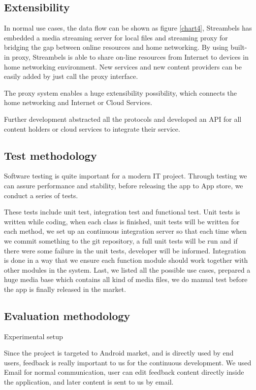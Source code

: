 \subsection{Extensibility}
In normal use cases, the data flow can be shown as figure \ref{chart4},
Streambels has embedded a media streaming server for local files and streaming
proxy for bridging the gap between online resources and home networking. By
using built-in proxy, Streambels is able to share on-line resources from
Internet to devices in home networking environment. New services and new
content providers can be easily added by just call the proxy interface.

The proxy system enables a huge extensibility possibility, which connects the
home networking and Internet or Cloud Services.

Further development abstracted all the protocols and developed an API for all
content holders or cloud services to integrate their service.

\subsection{Test methodology}
Software testing is quite important for a modern IT project. Through testing we
can assure performance and stability, before releasing the app to App store, we
conduct a series of tests.

These tests include unit test, integration test and functional test.
Unit tests is written while coding, when each class is finished, unit tests will
be written for each method, we set up an continuous integration server so that
each time when we commit something to the git repository, a full unit tests will
be run and if there were some failure in the unit tests, developer will be
informed. Integration is done in a way that we ensure each function module
should work together with other modules in the system. Last, we listed all the
possible use cases, prepared a huge media base which contains all kind of media
files, we do manual test before the app is finally released in the market.

\subsection{Evaluation methodology}
Experimental setup

Since the project is targeted to Android market, and is directly used by
end users, feedback is really important to us for the continuous development. We
used Email for normal communication, user can edit feedback content directly
inside the application, and later content is sent to us by email.

